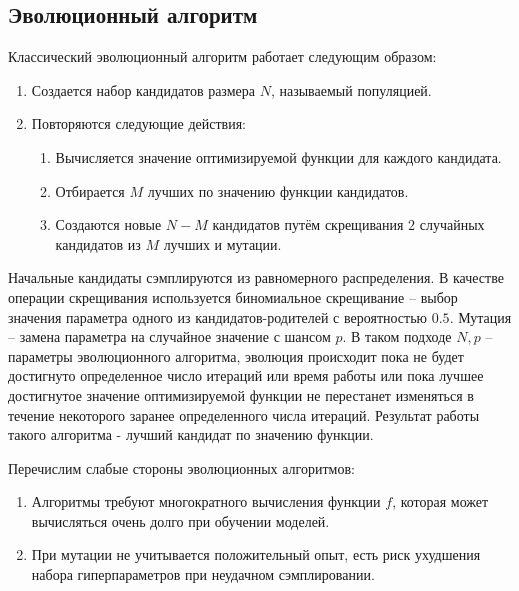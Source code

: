 \documentclass[a4paper,12pt]{article}
\begin{document}
\subsection{Эволюционный алгоритм}
Классический эволюционный алгоритм работает следующим образом:
\begin{enumerate}
    \item Создается набор кандидатов размера $N$, называемый популяцией.
    \item Повторяются следующие действия:
    \begin{enumerate}
        \item Вычисляется значение оптимизируемой функции для каждого кандидата.
        \item Отбирается $M$ лучших по значению функции кандидатов.
        \item Создаются новые $N - M$ кандидатов путём скрещивания $2$ случайных кандидатов из $M$ лучших и мутации.
    \end{enumerate}
\end{enumerate}

Начальные кандидаты сэмплируются из равномерного распределения.
В качестве операции скрещивания используется биномиальное скрещивание -- выбор значения параметра одного из кандидатов-родителей с вероятностью $0.5$. Мутация -- замена параметра на случайное значение с шансом $p$. В таком подходе $N, p$ -- параметры эволюционного алгоритма, эволюция происходит пока не будет достигнуто определенное число итераций или время работы или пока лучшее достигнутое значение оптимизируемой функции не перестанет изменяться в течение некоторого заранее определенного числа итераций. Результат работы такого алгоритма - лучший кандидат по значению функции. 

Перечислим слабые стороны эволюционных алгоритмов:
\begin{enumerate}
    \item Алгоритмы требуют многократного вычисления функции $f$, которая может вычисляться очень долго при обучении моделей.
    \item При мутации не учитывается положительный опыт, есть риск ухудшения набора гиперпараметров при неудачном сэмплировании.
\end{enumerate}
\end{document}
